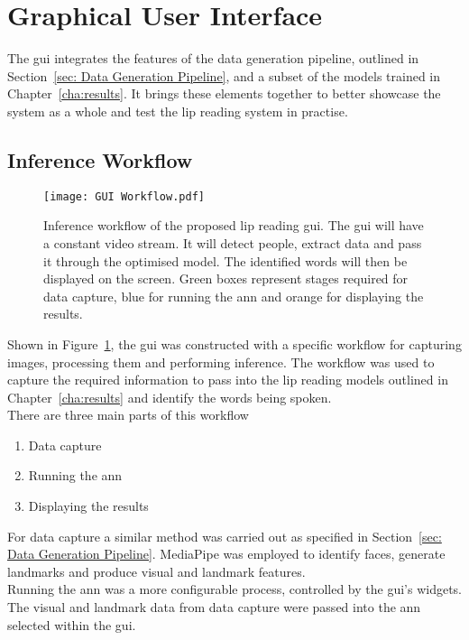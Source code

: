 \section{Graphical User Interface}
\label{sec: gui}
The \acrfull{gui} integrates the features of the data generation pipeline, outlined in Section~\ref{sec: Data Generation Pipeline}, and a subset of the models trained in Chapter~\ref{cha:results}. It brings these elements together to better showcase the system as a whole and test the lip reading system in practise.
\subsection{Inference Workflow}
\begin{figure}
\centering
\texttt{[image: GUI Workflow.pdf]}
\caption[Inference workflow of the proposed lip reading \acrshort{gui}.]{Inference workflow of the proposed lip reading \acrshort{gui}. The \acrshort{gui} will have a constant video stream. It will detect people, extract data and pass it through the optimised model. The identified words will then be displayed on the screen. Green boxes represent stages required for data capture, blue for running the \acrshort{ann} and orange for displaying the results.}
\label{fig:gui diagram}
\end{figure}
Shown in Figure~\ref{fig:gui diagram}, the \acrshort{gui} was constructed with a specific workflow for capturing images, processing them and performing inference. The workflow was used to capture the required information to pass into the lip reading models outlined in Chapter~\ref{cha:results} and identify the words being spoken.\\
There are three main parts of this workflow
\begin{enumerate}
    \item Data capture
    \item Running the \acrlong{ann}
    \item Displaying the results
\end{enumerate}
For data capture a similar method was carried out as specified in Section~\ref{sec: Data Generation Pipeline}. MediaPipe was employed to identify faces, generate landmarks and produce visual and landmark features.\\
Running the \acrshort{ann} was a more configurable process, controlled by the \acrshort{gui}'s widgets. The visual and landmark data from data capture were passed into the \acrshort{ann} selected within the \acrshort{gui}.\\
